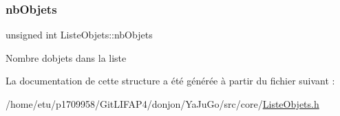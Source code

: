 \subsubsection{\texorpdfstring{nb\+Objets}{nbObjets}}
{\footnotesize\ttfamily unsigned int Liste\+Objets\+::nb\+Objets}

Nombre d\textquotesingle{}objets dans la liste 

La documentation de cette structure a été générée à partir du fichier suivant \+:\begin{DoxyCompactItemize}
\item 
/home/etu/p1709958/\+Git\+L\+I\+F\+A\+P4/donjon/\+Ya\+Ju\+Go/src/core/\mbox{\hyperlink{ListeObjets_8h}{Liste\+Objets.\+h}}\end{DoxyCompactItemize}

